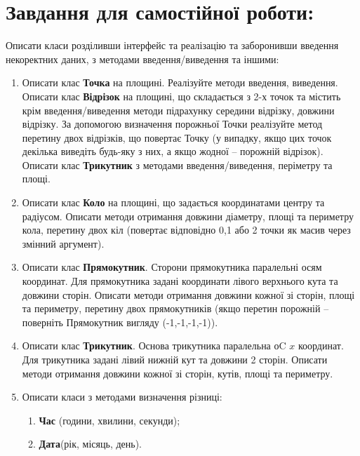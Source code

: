 \documentclass[a5paper,titlepage,openany,twoside,draft]{book_unv}%
\makeatletter
\newcommand{\xslalph}[1]{\expandafter\@xslalph\csname c@#1\endcsname}
\newcommand{\@xslalph}[1]{%
    \ifcase#1\or а\or б\or в\or г\or д\or e\or є\or ж\or з\or i%
    \or й\or к\or л\or м\or н\or о\or п\or р\or с\or т%
    \or у\or ф\or х\or ц\or ч\or ш\or ю\or я\or аа\or бб\or вв%
    \else\@ctrerr\fi%
}
\makeatother
\begin{document}
\section{Завдання для самостійної роботи:}

Описати класи розділивши інтерфейс та реалізацію та заборонивши введення
некоректних даних, з методами введення/виведення та іншими:

\begin{enumerate}
\def\labelenumi{\arabic{enumi})}
\setcounter{enumi}{3}
\item
  Описати клас \textbf{Точка} на площині. Реалізуйте методи введення,
  виведення. Описати клас \textbf{Відрізок} на площині, що складається
  з 2-х точок та містить крім введення/виведення методи підрахунку
  середини відрізку, довжини відрізку. За допомогою визначення
  порожньої Точки реалізуйте метод перетину двох відрізків, що повертає
  Точку (у випадку, якщо цих точок декілька виведіть будь-яку з них, а
  якщо жодної -- порожній відрізок). Описати клас \textbf{Трикутник} з 
  методами введення/виведення, періметру та площі.
 

\item
  Описати клас \textbf{Коло} на площині, що задається координатами
  центру та радіусом. Описати методи отримання довжини діаметру, площі
  та периметру кола, перетину двох кіл (повертає відповідно 0,1 або 2
  точки як масив через змінний аргумент).

\item
  Описати клас \textbf{Прямокутник}. Сторони прямокутника паралельні
  осям координат. Для прямокутника задані координати лівого верхнього
  кута та довжини сторін. Описати методи отримання довжини кожної зі
  сторін, площі та периметру, перетину двох прямокутників (якщо перетин
  порожній -- поверніть Прямокутник вигляду (-1,-1,-1,-1)).
\item
  Описати клас \textbf{Трикутник}. Основа трикутника паралельна оC
  $x$ координат. Для трикутника задані лівий нижній кут та довжини
  2 сторін. Описати методи отримання довжини кожної зі сторін, кутів,
  площі та периметру.

\item
  Описати класи з методами визначення різниці:
\begin{enumerate}[label=\xslalph*)]
\item \textbf{Час} (години, хвилини, секунди);
\item \textbf{Дата}(рік, місяць, день).
\end{enumerate}


\end{enumerate}
\end{document}
